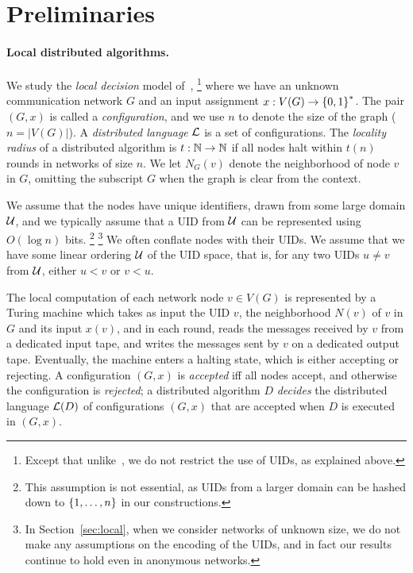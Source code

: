 \section{Preliminaries}
\label{sec:prelim}


\paragraph{Local distributed algorithms.}
We study the \emph{local decision} model of~\cite{fraigniaud2013towards},%
\footnote{Except that unlike~\cite{fraigniaud2013towards,balliu2018can},
we do not restrict the use of UIDs, as explained above.}
where we have an unknown communication network $G$ and an input assignment $x : V(G) \rightarrow \left \{{0,1} \right \}^*$.
The pair $(G, x)$ is called a \emph{configuration},
and we use $n$ to denote the size of the graph ($n = |V(G)|$).
A \emph{distributed language} $\mathcal{L}$ is a set of configurations.
The \emph{locality radius} of a distributed algorithm is $t : \mathbb{N} \rightarrow \mathbb{N}$
if all nodes halt within $t(n)$ rounds in networks of size $n$.
We let $N_G(v)$ denote the neighborhood of node $v$ in $G$, omitting the subscript $G$
when the graph is clear from the context.


We assume that the nodes have unique identifiers, drawn from some large domain $\mathcal{U}$,
and we typically assume that a UID from $\mathcal{U}$ can be represented using $O(\log n)$ bits.%
\footnote{This assumption is not essential, as UIDs from a larger domain can be hashed down to $\left \{{1,\ldots,n} \right \}$
in our constructions.}%
\footnote{In Section~\ref{sec:local}, when we consider networks of unknown size, we do not make
any assumptions on the encoding of the UIDs, and in fact our results continue to hold even
in anonymous networks.}
We often conflate nodes with their UIDs.
We assume that we have some linear ordering $\mathcal{U}$ of the UID space, that is, for any two UIDs $u \neq v$ from $\mathcal{U}$,
either $u < v$ or $v < u$.

%
The local computation of each network node $v \in V(G)$ is represented by a Turing machine which takes as input the UID $v$,
the neighborhood $N(v)$
of $v$ in $G$ and its input $x(v)$, and in each round, reads the messages received by $v$ from a dedicated input tape,
and writes the messages sent by $v$ on a dedicated output tape.
Eventually, the machine enters a halting state, which is either accepting or rejecting.
A configuration $(G, x)$ is \emph{accepted} iff all nodes accept, and otherwise the configuration is \emph{rejected};
a distributed algorithm $D$ \emph{decides} the distributed language $\mathcal{L}(D)$
of configurations $(G,x)$ that are accepted when $D$ is executed in $(G,x)$.

